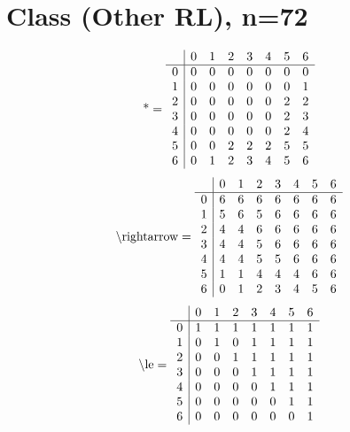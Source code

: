 \documentclass[11pt]{article}
\begin{document}
\section{Class (Other RL), n=72}
\[\text{*} = 
\begin{array}{r | r r r r r r r}
 & 0 & 1 & 2 & 3 & 4 & 5 & 6 \\ \hline
0 & 0 & 0 & 0 & 0 & 0 & 0 & 0 \\
1 & 0 & 0 & 0 & 0 & 0 & 0 & 1 \\
2 & 0 & 0 & 0 & 0 & 0 & 2 & 2 \\
3 & 0 & 0 & 0 & 0 & 0 & 2 & 3 \\
4 & 0 & 0 & 0 & 0 & 0 & 2 & 4 \\
5 & 0 & 0 & 2 & 2 & 2 & 5 & 5 \\
6 & 0 & 1 & 2 & 3 & 4 & 5 & 6 \\
\end{array}
\]
\[\text{\textbackslash rightarrow} = 
\begin{array}{r | r r r r r r r}
 & 0 & 1 & 2 & 3 & 4 & 5 & 6 \\ \hline
0 & 6 & 6 & 6 & 6 & 6 & 6 & 6 \\
1 & 5 & 6 & 5 & 6 & 6 & 6 & 6 \\
2 & 4 & 4 & 6 & 6 & 6 & 6 & 6 \\
3 & 4 & 4 & 5 & 6 & 6 & 6 & 6 \\
4 & 4 & 4 & 5 & 5 & 6 & 6 & 6 \\
5 & 1 & 1 & 4 & 4 & 4 & 6 & 6 \\
6 & 0 & 1 & 2 & 3 & 4 & 5 & 6 \\
\end{array}
\]
\[\text{\textbackslash le} = 
\begin{array}{r | r r r r r r r}
 & 0 & 1 & 2 & 3 & 4 & 5 & 6 \\ \hline
0 & 1 & 1 & 1 & 1 & 1 & 1 & 1 \\
1 & 0 & 1 & 0 & 1 & 1 & 1 & 1 \\
2 & 0 & 0 & 1 & 1 & 1 & 1 & 1 \\
3 & 0 & 0 & 0 & 1 & 1 & 1 & 1 \\
4 & 0 & 0 & 0 & 0 & 1 & 1 & 1 \\
5 & 0 & 0 & 0 & 0 & 0 & 1 & 1 \\
6 & 0 & 0 & 0 & 0 & 0 & 0 & 1 \\
\end{array}
\]
\end{document}
